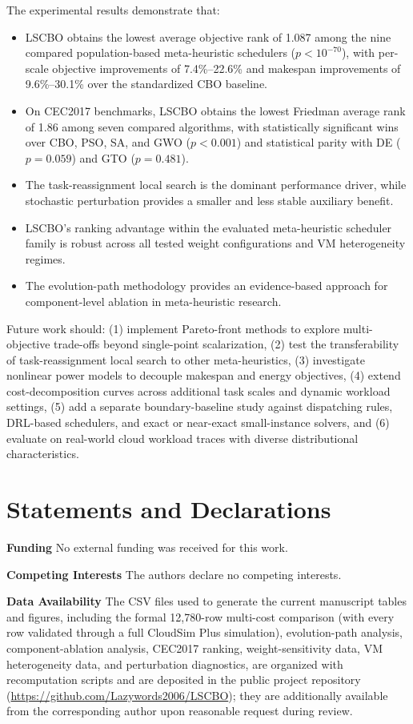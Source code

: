 \documentclass[pdflatex,onecolumn,sn-mathphys-num]{sn-jnl}
\begin{document}
The experimental results demonstrate that:
\begin{itemize}
    \item LSCBO obtains the lowest average objective rank of 1.087 among the nine compared population-based meta-heuristic schedulers ($p < 10^{-70}$), with per-scale objective improvements of 7.4\%--22.6\% and makespan improvements of 9.6\%--30.1\% over the standardized CBO baseline.
    \item On CEC2017 benchmarks, LSCBO obtains the lowest Friedman average rank of 1.86 among seven compared algorithms, with statistically significant wins over CBO, PSO, SA, and GWO ($p < 0.001$) and statistical parity with DE ($p = 0.059$) and GTO ($p = 0.481$).
    \item The task-reassignment local search is the dominant performance driver, while stochastic perturbation provides a smaller and less stable auxiliary benefit.
    \item LSCBO's ranking advantage within the evaluated meta-heuristic scheduler family is robust across all tested weight configurations and VM heterogeneity regimes.
    \item The evolution-path methodology provides an evidence-based approach for component-level ablation in meta-heuristic research.
\end{itemize}

Future work should: (1) implement Pareto-front methods to explore multi-objective trade-offs beyond single-point scalarization, (2) test the transferability of task-reassignment local search to other meta-heuristics, (3) investigate nonlinear power models to decouple makespan and energy objectives, (4) extend cost-decomposition curves across additional task scales and dynamic workload settings, (5) add a separate boundary-baseline study against dispatching rules, DRL-based schedulers, and exact or near-exact small-instance solvers, and (6) evaluate on real-world cloud workload traces with diverse distributional characteristics.

\section*{Statements and Declarations}
\textbf{Funding} No external funding was received for this work.

\textbf{Competing Interests} The authors declare no competing interests.

\textbf{Data Availability} The CSV files used to generate the current manuscript tables and figures, including the formal 12,780-row multi-cost comparison (with every row validated through a full CloudSim Plus simulation), evolution-path analysis, component-ablation analysis, CEC2017 ranking, weight-sensitivity data, VM heterogeneity data, and perturbation diagnostics, are organized with recomputation scripts and are deposited in the public project repository (\url{https://github.com/Lazywords2006/LSCBO}); they are additionally available from the corresponding author upon reasonable request during review.
\end{document}
